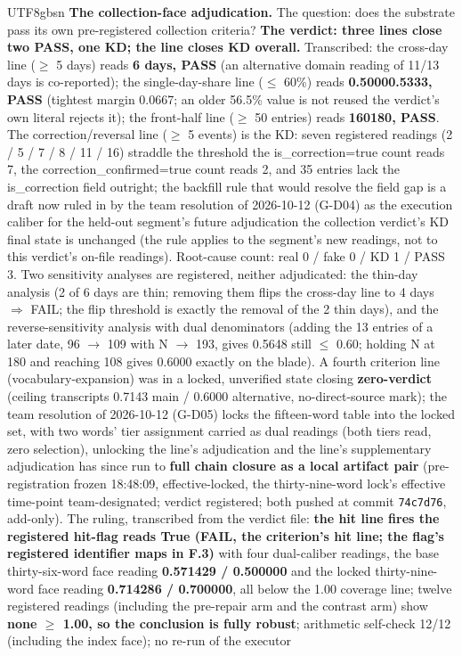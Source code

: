 \documentclass[11pt,letterpaper]{article}
\begin{document}
\begin{CJK}{UTF8}{gbsn}
\textbf{The collection-face adjudication.} The question: does the substrate pass its own pre-registered collection criteria? \textbf{The verdict: three lines close \textemdash{} two PASS, one KD; the line closes KD overall.} Transcribed: the cross-day line (\ensuremath{\geq} 5 days) reads \textbf{6 days, PASS} (an alternative domain reading of 11/13 days is co-reported); the single-day-share line (\ensuremath{\leq} 60\%) reads \textbf{0.5000\textendash{}0.5333, PASS} (tightest margin 0.0667; an older 56.5\% value is not reused \textemdash{} the verdict's own literal rejects it); the front-half line (\ensuremath{\geq} 50 entries) reads \textbf{160\textendash{}180, PASS}. The correction/reversal line (\ensuremath{\geq} 5 events) is the KD: seven registered readings (2 / 5 / 7 / 8 / 11 / 16) straddle the threshold \textemdash{} the is\_correction=true count reads 7, the correction\_confirmed=true count reads 2, and 35 entries lack the is\_correction field outright; the backfill rule that would resolve the field gap is a draft now ruled in by the team resolution of 2026-10-12 (G-D04) as the execution caliber for the held-out segment's future adjudication \textemdash{} the collection verdict's KD final state is unchanged (the rule applies to the segment's new readings, not to this verdict's on-file readings). Root-cause count: real 0 / fake 0 / KD 1 / PASS 3. Two sensitivity analyses are registered, neither adjudicated: the thin-day analysis (2 of 6 days are thin; removing them flips the cross-day line to 4 days \ensuremath{\Rightarrow} FAIL; the flip threshold is exactly the removal of the 2 thin days), and the reverse-sensitivity analysis with dual denominators (adding the 13 entries of a later date, 96 \ensuremath{\to} 109 with N \ensuremath{\to} 193, gives 0.5648 \textemdash{} still \ensuremath{\leq} 0.60; holding N at 180 and reaching 108 gives 0.6000 \textemdash{} exactly on the blade). A fourth criterion line (vocabulary-expansion) was in a locked, unverified state closing \textbf{zero-verdict} (ceiling transcripts 0.7143 main / 0.6000 alternative, no-direct-source mark); the team resolution of 2026-10-12 (G-D05) locks the fifteen-word table into the locked set, with two words' tier assignment carried as dual readings (both tiers read, zero selection), unlocking the line's adjudication \textemdash{} and the line's supplementary adjudication has since run to \textbf{full chain closure as a local artifact pair} (pre-registration frozen 18:48:09, effective-locked, the thirty-nine-word lock's effective time-point team-designated; verdict registered; both pushed at commit \texttt{74c7d76}, add-only). The ruling, transcribed from the verdict file: \textbf{the hit line fires \textemdash{} the registered hit-flag reads True (FAIL, the criterion's hit line; the flag's registered identifier maps in F.3)} \textemdash{} with four dual-caliber readings, the base thirty-six-word face reading \textbf{0.571429 / 0.500000} and the locked thirty-nine-word face reading \textbf{0.714286 / 0.700000}, all below the 1.00 coverage line; twelve registered readings (including the pre-repair arm and the contrast arm) show \textbf{none \ensuremath{\geq} 1.00, so the conclusion is fully robust}; arithmetic self-check 12/12 (including the index face); no re-run of the executor 
\end{CJK}
\end{document}
